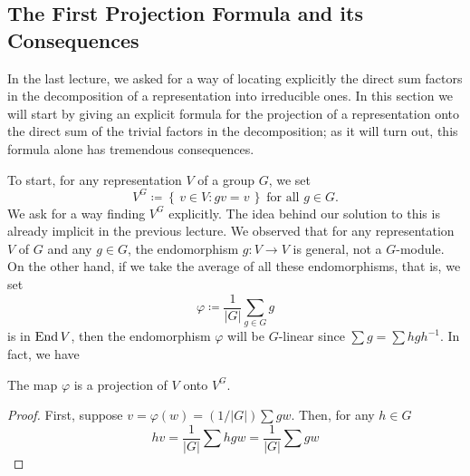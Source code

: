 \subsection{The First Projection Formula and its Consequences}
In the last lecture, we asked for a way of locating explicitly the direct
sum factors in the decomposition of a representation into irreducible
ones. In this section we will start by giving an explicit formula for the
projection of a representation onto the direct sum of the trivial factors
in the decomposition; as it will turn out, this formula alone has tremendous
consequences.

To start, for any representation $V$ of a group $G$, we set
\[
V^G\coloneqq\left\{\,v\in V:gv=v\,\right\}
\;\text{for all $g\in G$.}
\]
We ask for a way finding $V^G$ explicitly. The idea behind our solution to
this is already implicit in the previous lecture. We observed that for any
representation $V$ of $G$ and any $g\in G$, the endomorphism $g\colon V\to
V$ is general, not a $G$-module. On the other hand, if we take the average
of all these endomorphisms, that is, we set
\[
\varphi\coloneqq\frac{1}{|G|}\sum_{g\in G}g
\]
is in $\operatorname{End} V$, then the endomorphism $\varphi$ will be $G$-linear since
$\sum g=\sum hgh^{-1}$. In fact, we have
\begin{proposition}
The map $\varphi$ is a projection of $V$ onto $V^G$.
\end{proposition}

\begin{proof}
First, suppose $v=\varphi(w)=(1/|G|)\sum gw$. Then, for any $h\in
G$
\[
hv=\frac{1}{|G|}\sum hgw=\frac{1}{|G|}\sum gw
\]
\end{proof}


